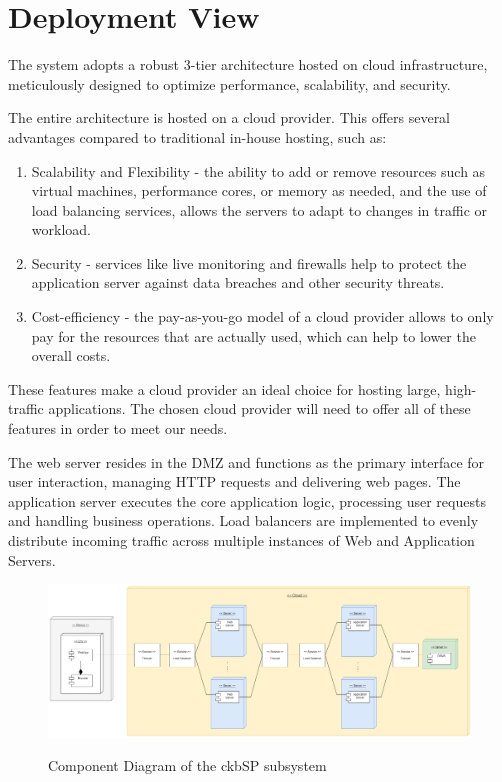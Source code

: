 \documentclass{Configuration_Files/Template}
\begin{document}
\section{Deployment View}

The system adopts a robust 3-tier architecture hosted on cloud infrastructure, meticulously designed to optimize performance, scalability, and security.

The entire architecture is hosted on a cloud provider. This offers several advantages compared to traditional in-house hosting, such as:
\begin{enumerate}
    \item Scalability and Flexibility - the ability to add or remove resources such as virtual machines, performance cores, or memory as needed, and the use of load balancing services, allows the servers to adapt to changes in traffic or workload.
    \item Security - services like live monitoring and firewalls help to protect the application server against data breaches and other security threats.
    \item Cost-efficiency - the pay-as-you-go model of a cloud provider allows to only pay for the resources that are actually used, which can help to lower the overall costs.
\end{enumerate}
These features make a cloud provider an ideal choice for hosting large, high-traffic applications. The chosen cloud provider will need to offer all of these features in order to meet our needs.

The web server resides in the DMZ and functions as the primary interface for user interaction, managing HTTP requests and delivering web pages. The application server executes the core application logic, processing user requests and handling business operations. Load balancers are implemented to evenly distribute incoming traffic across multiple instances of Web and Application Servers.

\begin{figure}[H]
\centering
\includegraphics[scale = 0.4]{Images/diagrams/Deployment_view.png}\\
\caption{Component Diagram of the ckbSP subsystem}
\end{figure}
\end{document}
